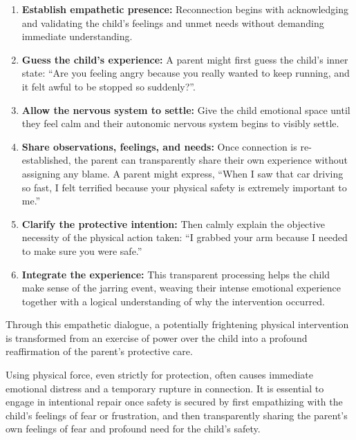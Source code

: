 \begin{enumerate}
  \item \textbf{Establish empathetic presence:} Reconnection begins with acknowledging and validating the child's feelings and unmet needs without demanding immediate understanding.
  \item \textbf{Guess the child's experience:} A parent might first guess the child's inner state: ``Are you feeling angry because you really wanted to keep running, and it felt awful to be stopped so suddenly?''.
  \item \textbf{Allow the nervous system to settle:} Give the child emotional space until they feel calm and their autonomic nervous system begins to visibly settle.
  \item \textbf{Share observations, feelings, and needs:} Once connection is re-established, the parent can transparently share their own experience without assigning any blame.
  A parent might express, ``When I saw that car driving so fast, I felt terrified because your physical safety is extremely important to me.''
  \item \textbf{Clarify the protective intention:} Then calmly explain the objective necessity of the physical action taken: ``I grabbed your arm because I needed to make sure you were safe.''
  \item \textbf{Integrate the experience:} This transparent processing helps the child make sense of the jarring event, weaving their intense emotional experience together with a logical understanding of why the intervention occurred.
\end{enumerate}

Through this empathetic dialogue, a potentially frightening physical intervention is transformed from an exercise of power over the child into a profound reaffirmation of the parent's protective care.

\begin{keyinsight}
Using physical force, even strictly for protection, often causes immediate emotional distress and a temporary rupture in connection.
It is essential to engage in intentional repair once safety is secured by first empathizing with the child's feelings of fear or frustration, and then transparently sharing the parent's own feelings of fear and profound need for the child's safety.
\end{keyinsight}

\newpage
